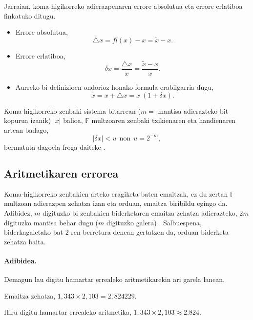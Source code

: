 Jarraian, koma-higikorreko adierazpenaren errore absolutua eta errore erlatiboa finkatuko ditugu.
\begin{itemize}
\item Errore absolutua,
\begin{equation*}
\triangle x= fl(x)-x= \tilde{x}-x. 
\end{equation*} 
\item Errore erlatiboa, 
\begin{equation*}
\delta x =\frac{\triangle x}{x} = \frac{\tilde{x}-x}{x}. 
\end{equation*}
\item Aurreko bi definizioen ondorioz honako formula erabilgarria dugu,
\begin{equation*}
\tilde{x}= x+\triangle x = x \ (1+\delta x).
\end{equation*}
\end{itemize}

Koma-higikorreko zenbaki sistema bitarrean ($m=$ mantisa adierazteko bit kopurua izanik) $|x|$ balioa, $\mathbb{F}$ multzoaren zenbaki txikienaren eta handienaren artean badago,
\begin{equation*}
 |\delta x|< u \ \ \text{non} \ \ u=2^{-m},
 \end{equation*}
bermatuta dagoela froga daiteke \cite{Corless2013}.

\subsection*{Aritmetikaren errorea} 

Koma-higikorreko zenbakien arteko eragiketa baten emaitzak, ez du zertan $\mathbb{F}$ multzoan adierazpen zehatza izan  eta orduan, emaitza biribildu egingo  da. Adibidez, $m$ digituzko bi zenbakien biderketaren emaitza zehatza adierazteko, $2m$ digituzko mantisa behar dugu ($m$ digituzko galera) \cite{Fukushima2001}. Salbuespena, biderkagaietako bat $2$-ren berretura denean gertatzen da, orduan biderketa zehatza baita.

\paragraph*{Adibidea.} Demagun lau digitu hamartar errealeko aritmetikarekin ari garela lanean.

Emaitza zehatza, $1,343 \times 2,103 = 2,824229$. 

Hiru digitu hamartar errealeko aritmetika, $1,343 \times 2,103 \approx 2.824$.

